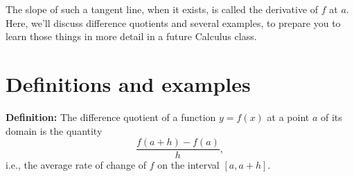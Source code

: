 \documentclass{ximera}
\begin{document}


The slope of such a tangent line, when it exists, is called the derivative of $f$ at $a$. Here, we'll discuss difference quotients and several examples, to prepare you to learn those things in more detail in a future Calculus class.


\section{Definitions and examples}

\begin{callout}
  {\bf Definition:} The difference quotient of a function $y=f(x)$ at a point $a$ of its domain is the quantity $$\frac{f(a+h)-f(a)}{h},$$i.e., the average rate of change of $f$ on the interval $[a,a+h]$.
\end{callout}
\end{document}
